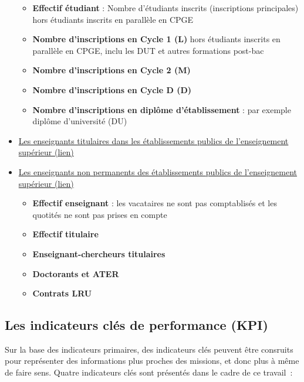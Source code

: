 \documentclass[12pt,french,]{article}
\providecommand{\tightlist}{%
  \setlength{\itemsep}{0pt}\setlength{\parskip}{0pt}}
\begin{document}
\begin{itemize}
  \begin{itemize}
  \tightlist
  \item
    \textbf{Effectif étudiant} : Nombre d'étudiants inscrits
    (inscriptions principales) hors étudiants inscrits en parallèle en
    CPGE
  \item
    \textbf{Nombre d'inscriptions en Cycle 1 (L)} hors étudiants
    inscrits en parallèle en CPGE, inclu les DUT et autres formations
    post-bac
  \item
    \textbf{Nombre d'inscriptions en Cycle 2 (M)}
  \item
    \textbf{Nombre d'inscriptions en Cycle D (D)}
  \item
    \textbf{Nombre d'inscriptions en diplôme d'établissement} : par
    exemple diplôme d'université (DU)
  \end{itemize}
\item
  \href{https://data.enseignementsup-recherche.gouv.fr/explore/dataset/fr-esr-enseignants-titulaires-esr-public/}{Les
  enseignants titulaires dans les établissements publics de
  l'enseignement supérieur (lien)}
\item
  \href{https://data.enseignementsup-recherche.gouv.fr/explore/dataset/fr-esr-enseignants-nonpermanents-esr-public/}{Les
  enseignants non permanents des établissements publics de
  l'enseignement supérieur (lien)}

  \begin{itemize}
  \tightlist
  \item
    \textbf{Effectif enseignant} : les vacataires ne sont pas
    comptablisés et les quotités ne sont pas prises en compte
  \item
    \textbf{Effectif titulaire}
  \item
    \textbf{Enseignant-chercheurs titulaires}
  \item
    \textbf{Doctorants et ATER}
  \item
    \textbf{Contrats LRU}
  \end{itemize}
\end{itemize}

\hypertarget{les-indicateurs-cluxe9s-de-performance-kpi}{%
\subsection{Les indicateurs clés de performance
(KPI)}\label{les-indicateurs-cluxe9s-de-performance-kpi}}

Sur la base des indicateurs primaires, des indicateurs clés peuvent être
consruits pour représenter des informations plus proches des missions,
et donc plus à même de faire sens. Quatre indicateurs clés sont
présentés dans le cadre de ce travail~:
\end{document}
